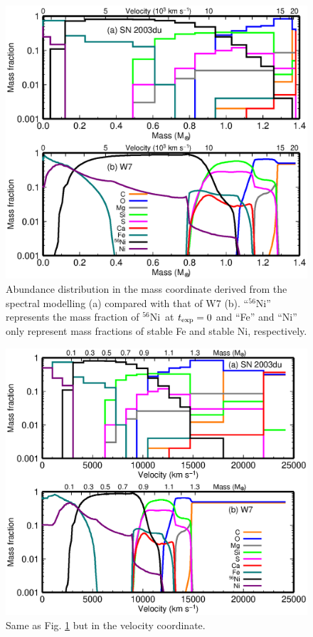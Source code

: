 \documentclass[usegraphicx,usenatbib]{mn2e}
\newcommand{\Nifs}{$^{56}$Ni}
\newcommand{\texp}{t_{\rm exp}}
\begin{document}
\begin{figure}
  \includegraphics[scale=0.65]{f7.eps} 
  \caption{Abundance distribution in the mass coordinate 
derived from the spectral modelling (a) compared with that of W7 (b).
``\Nifs'' represents the mass fraction of \Nifs\ at $\texp=0$ and ``Fe'' and 
``Ni'' only represent mass fractions of stable Fe and stable Ni, respectively.
  }
\label{fig:abunmass}
\end{figure}

\begin{figure}
  \includegraphics[scale=0.65]{f8.eps} 
  \caption{
Same as Fig. \ref{fig:abunmass} but in the velocity coordinate.
}
\label{fig:abunvel}
\end{figure}
\end{document}
